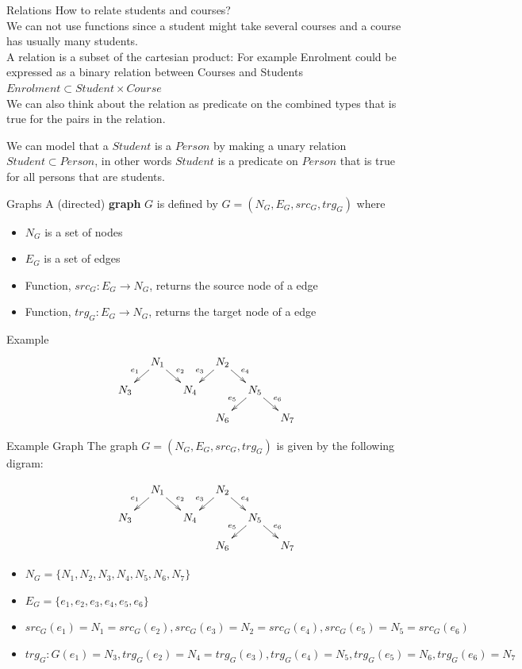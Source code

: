 \documentclass[slidetop,mathserif,red]{beamer}
\begin{document}
\begin{frame}{Relations}
How to relate students and courses?\\
 We can not use functions since a student might take several courses and a course has usually many students.\\
A relation is a subset of the cartesian product:
For example Enrolment could be expressed as a binary relation between Courses and Students
$Enrolment \subset Student \times Course$ \\
We can also think about the relation as predicate on the combined types that is true for the pairs in the relation.

We can model that a $Student$ is a $Person$ by making a unary relation $Student \subset Person$, in other words $Student$ is a predicate on $Person$ that is true for all persons that are students.
\end{frame}


\begin{frame}{Graphs}
A (directed) \textbf{graph} $G$ is defined by $G=(N_G,E_G,src_G,trg_G)$ where
  \begin{itemize}
  \item $N_G$ is a set of nodes
  \item $E_G$ is a set of edges
  \item Function, $src_G:E_G \to N_G$, returns the source node of a edge
  \item Function, $trg_G:E_G \to N_G$, returns the target node of a edge
  \end{itemize}
{Example}
     \[\xymatrixrowsep{0.15in}
		\xymatrixcolsep{0.15in}
      \xymatrix{		& N_1 \ar[dl]_{e_1} \ar[dr]	^{e_2}	&& N_2 \ar[dl]_{e_3} \ar[dr]^{e_4}\\
      					N_3		&&  N_4	& 						& N_5 \ar[dl]_{e_5} \ar[dr]^{e_6}\\
      																&&& N_6			&&  N_7} \]
\end{frame}


\begin{frame}{Example Graph}
The graph $G=(N_G,E_G,src_G,trg_G)$ is given by the following digram:

     \[\xymatrixrowsep{0.15in}
		\xymatrixcolsep{0.15in}
      \xymatrix{		& N_1 \ar[dl]_{e_1} \ar[dr]	^{e_2}	&& N_2 \ar[dl]_{e_3} \ar[dr]^{e_4}\\
      					N_3		&&  N_4	& 						& N_5 \ar[dl]_{e_5} \ar[dr]^{e_6}\\
      																&&& N_6			&&  N_7} \]
  \begin{itemize}
  \item $N_G = \{ N_1 ,  N_2 ,  N_3 ,  N_4 ,  N_5 ,  N_6 ,  N_7\}$ 
  \item $E_G =\{ e_1 ,  e_2 ,  e_3 ,  e_4 ,  e_5 ,  e_6 \}$
  \item $src_G(e_1) = N_1 = src_G( e_2),  src_G(e_3)=N_2 = src_G(e_4) ,  src_G(e_5) = N_5 =  src_G(e_6 ) $
  \item $trg_G:G(e_1) = N_3 , trg_G( e_2)=N_4 =   trg_G(e_3),  trg_G(e_4)=N_5 ,  trg_G(e_5) = N_6 ,  trg_G(e_6 ) = N_7$ 
  \end{itemize}

\end{frame}
\end{document}
